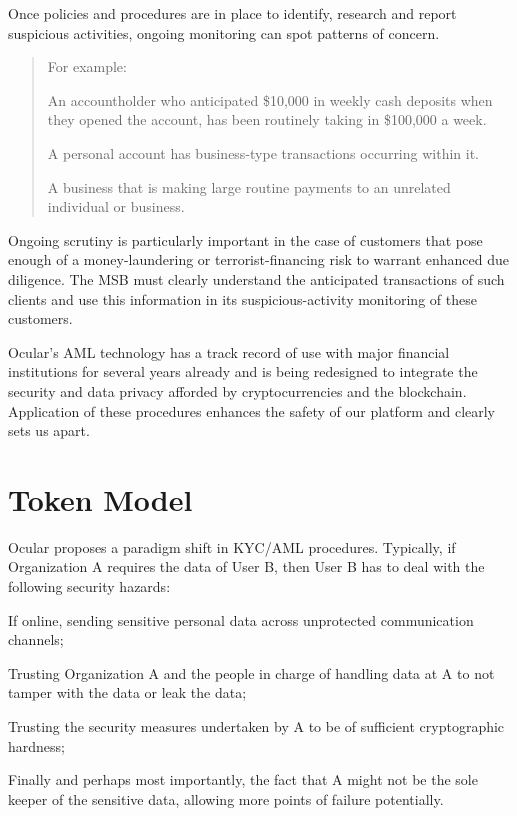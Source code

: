 \documentclass[a4paper]{article}
\let\tempone\itemize
\let\temptwo\enditemize
\renewenvironment{itemize}{\tempone\addtolength{\itemsep}{-5pt}}{\temptwo}
\begin{document}
Once policies and procedures are in place to identify, research and report suspicious activities, ongoing monitoring can spot patterns of concern. 
\begin{quotation}For example:
\begin{itemize}
  \item An accountholder who anticipated \$10,000 in weekly cash deposits when they opened the account, has been routinely taking in \$100,000 a week.
  \item A personal account has business-type transactions occurring within it.
  \item A business that is making large routine payments to an unrelated individual or business.
\end{itemize}
\end{quotation}

Ongoing scrutiny is particularly important in the case of customers that pose enough of a money-laundering or terrorist-financing risk to warrant enhanced due diligence. The MSB must clearly understand the anticipated transactions of such clients and use this information in its suspicious-activity monitoring of these customers.

Ocular's AML technology has a track record of use with major financial institutions for several years already and is being redesigned to integrate the security and data privacy afforded by cryptocurrencies and the blockchain. Application of these procedures enhances the safety of our platform and clearly sets us apart.
\newpage

\section{Token Model}

Ocular proposes a paradigm shift in KYC/AML procedures. Typically, if Organization A requires the data of User B, then User B has to deal with the following security hazards:
\begin{itemize}
\item If online, sending sensitive personal data across unprotected communication channels;
\item Trusting Organization A and the people in charge of handling data at A to not tamper with the data or leak the data;
\item Trusting the security measures undertaken by A to be of sufficient cryptographic hardness; 
\item Finally and perhaps most importantly, the fact that A might not be the sole keeper of the sensitive data, allowing more points of failure potentially. 
\end{itemize}
\end{document}
